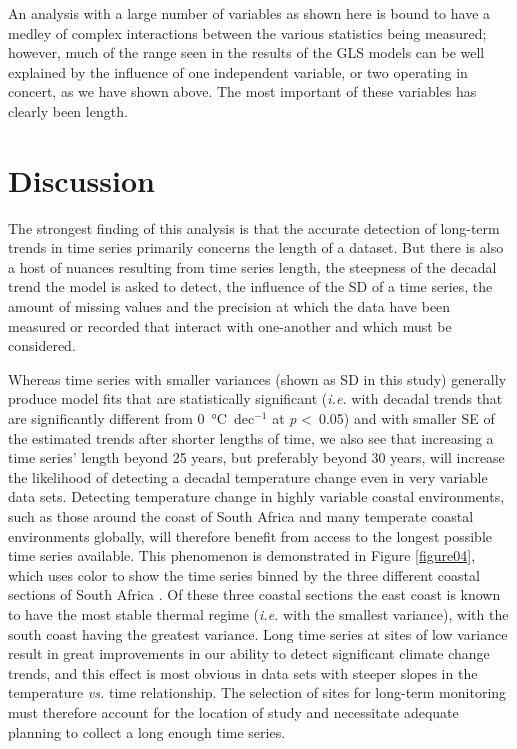 \documentclass[]{ametsoc}
\begin{document}
An analysis with a large number of variables as shown here is bound to have a medley of complex interactions between the various statistics being measured; however, much of the range seen in the results of the GLS models can be well explained by the influence of one independent variable, or two operating in concert, as we have shown above. The most important of these variables has clearly been length.

\section{Discussion}
The strongest finding of this analysis is that the accurate detection of long-term trends in time series primarily concerns the length of a dataset. But there is also a host of nuances resulting from time series length, the steepness of the decadal trend the model is asked to detect, the influence of the SD of a time series, the amount of missing values and the precision at which the data have been measured or recorded that interact with one-another and which must be considered.

Whereas time series with smaller variances (shown as SD in this study) generally produce model fits that are statistically significant (\emph{i.e.} with decadal trends that are significantly different from \SI{0}{\degreeCelsius}~dec$^{-1}$ at \emph{p} \textless~0.05) and with smaller SE of the estimated trends after shorter lengths of time, we also see that increasing a time series' length beyond 25 years, but preferably beyond 30 years, will increase the likelihood of detecting a decadal temperature change even in very variable data sets. Detecting temperature change in highly variable coastal environments, such as those around the coast of South Africa and many temperate coastal environments globally, will therefore benefit from access to the longest possible time series available. This phenomenon is demonstrated in Figure \ref{figure04}, which uses color to show the time series binned by the three different coastal sections of South Africa \citep{Smit2013}. Of these three coastal sections the east coast is known to have the most stable thermal regime (\emph{i.e.} with the smallest variance), with the south coast having the greatest variance. Long time series at sites of low variance result in great improvements in our ability to detect significant climate change trends, and this effect is most obvious in data sets with steeper slopes in the temperature \emph{vs.} time relationship. The selection of sites for long-term monitoring must therefore account for the location of study and necessitate adequate planning to collect a long enough time series.
\end{document}
